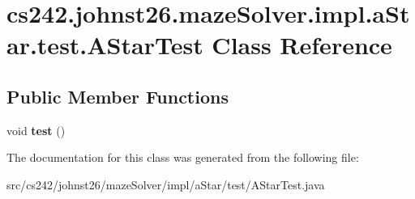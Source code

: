 \hypertarget{classcs242_1_1johnst26_1_1maze_solver_1_1impl_1_1a_star_1_1test_1_1_a_star_test}{\section{cs242.\-johnst26.\-maze\-Solver.\-impl.\-a\-Star.\-test.\-A\-Star\-Test Class Reference}
\label{classcs242_1_1johnst26_1_1maze_solver_1_1impl_1_1a_star_1_1test_1_1_a_star_test}
}
\subsection*{Public Member Functions}
\begin{DoxyCompactItemize}
\item 
\hypertarget{classcs242_1_1johnst26_1_1maze_solver_1_1impl_1_1a_star_1_1test_1_1_a_star_test_a86321d4196ca28385ec7b01d1db6ef35}{void {\bfseries test} ()}\label{classcs242_1_1johnst26_1_1maze_solver_1_1impl_1_1a_star_1_1test_1_1_a_star_test_a86321d4196ca28385ec7b01d1db6ef35}

\end{DoxyCompactItemize}


The documentation for this class was generated from the following file\-:\begin{DoxyCompactItemize}
\item 
src/cs242/johnst26/maze\-Solver/impl/a\-Star/test/A\-Star\-Test.\-java\end{DoxyCompactItemize}
